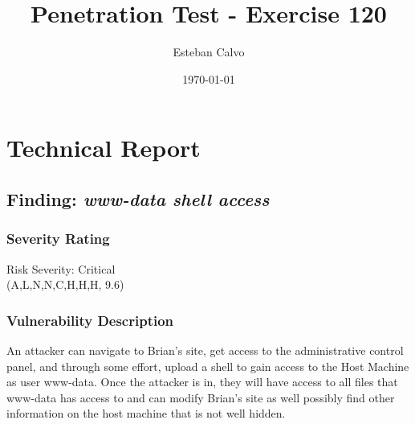 \documentclass[notitlepage]{article}
\begin{document}
  
\title{Penetration Test - Exercise 120}
\author{Esteban Calvo}
\date{\isodate\today}

\maketitle

\tableofcontents

\newpage

\section{Technical Report}


  \subsection{Finding: \emph{www-data shell access}}
  

	\subsubsection*{Severity Rating}
	    Risk Severity: Critical \\
		\cvss(A,L,N,N,C,H,H,H, 9.6)
		
  	\subsubsection*{Vulnerability Description}
        An attacker can navigate to Brian's site, get access to the administrative control panel, and through some effort, upload a shell to gain access
        to the Host Machine as user www-data. Once the attacker is in, they will have access to all files that www-data has access to and can modify
        Brian's site as well possibly find other information on the host machine that is not well hidden.
\end{document}
